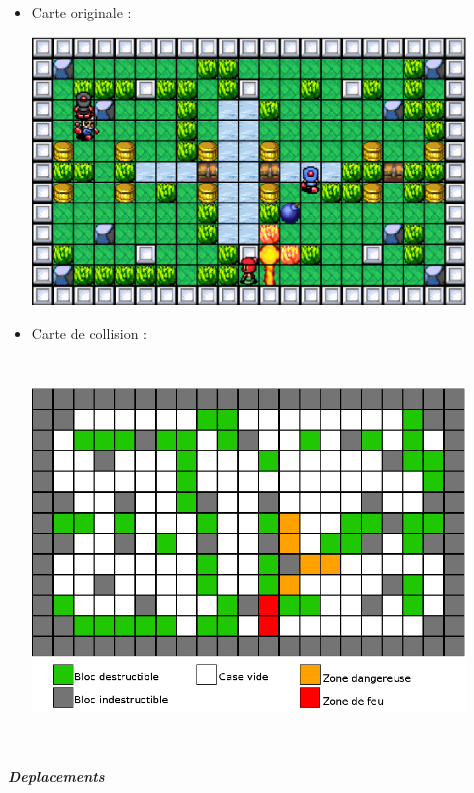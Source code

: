 				\begin{itemize}
				  \item Carte originale :
				  
						\begin{center}						
							\includegraphics[width=115mm,height=71mm]{Developpement/Img/mapcolision_1.eps}
						\end{center}				  		
				  
				  \item Carte de collision :
				  
						\begin{center}						
							\includegraphics[width=115mm,height=102mm]{Developpement/Img/mapcolision_2.eps}
						\end{center}
						
				\end{itemize}
		

			\subparagraph{Deplacements\\}
			
